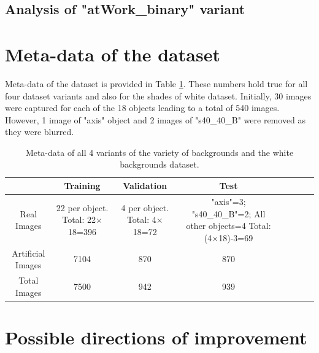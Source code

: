 	\subsection{Analysis of "atWork\_binary" variant}
	

\newpage
\section{Meta-data of the dataset}

Meta-data of the dataset is provided in Table \ref{Table:meta}. These numbers hold true for all four dataset variants and also for the shades of white dataset. Initially, 30 images were captured for each of the 18 objects leading to a total of 540 images. However, 1 image of "axis" object and 2 images of "s40\_40\_B" were removed as they were blurred.

\begin{table}
	\centering
	\begin{tabular}{|c|c|c|c|c|c|c|c|}
	\hline 
    & Training & Validation & Test \\ 
	\hline 
	Real Images & \makecell{22 per object.\\ Total: 22$\times$18=396} & \makecell{4 per object.\\ Total: 4$\times$18=72} & 				\makecell{"axis"=3; \\"s40\_40\_B"=2; \\All other objects=4\\ Total: (4$\times$18)-3=69} \\ 
	\hline 
	Artificial Images & 7104 & 870 & 870 \\ 
	\hline 
	Total Images & 7500 & 942 & 939 \\ 
	\hline 
	\end{tabular}
	\caption{Meta-data of all 4 variants of the variety of backgrounds and the white backgrounds dataset.} 
	\label{Table:meta}
\end{table}

\section{Possible directions of improvement}

